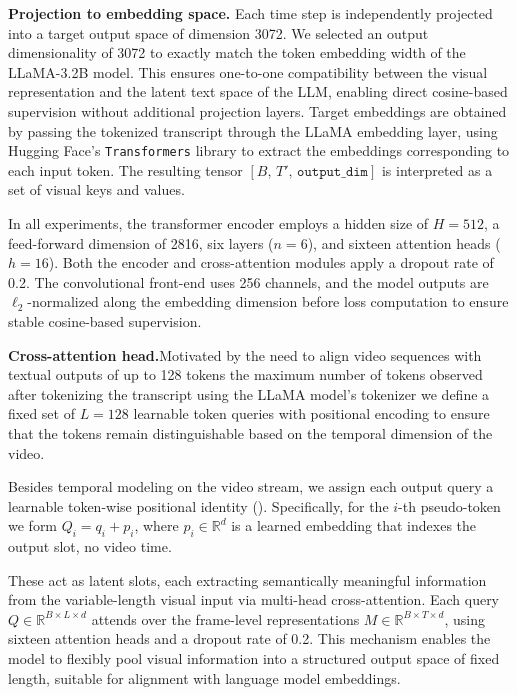 \documentclass[runningheads]{llncs}
\begin{document}
\textbf{Projection to embedding space.} 
Each time step is independently projected into a target output space of dimension 3072. 
We selected an output dimensionality of 3072 to exactly match the token embedding width of the LLaMA-3.2B model. 
This ensures one-to-one compatibility between the visual representation and the latent text space of the LLM, enabling direct cosine-based supervision without additional projection layers. 
Target embeddings are obtained by passing the tokenized transcript through the LLaMA embedding layer, using Hugging Face's \texttt{Transformers} library to extract the embeddings corresponding to each input token. 
The resulting tensor \([B,\, T',\, \mathtt{output\_dim}]\) is interpreted as a set of visual keys and values. 

In all experiments, the transformer encoder employs a hidden size of \(H=512\), a feed-forward dimension of 2816, six layers (\(n=6\)), and sixteen attention heads (\(h=16\)). 
Both the encoder and cross-attention modules apply a dropout rate of 0.2. 
The convolutional front-end uses 256 channels, and the model outputs are $\ell_2$-normalized along the embedding dimension before loss computation to ensure stable cosine-based supervision.

\textbf{Cross-attention head.}Motivated by the need to align video sequences with textual outputs of up to 128 tokens the maximum number of tokens observed after tokenizing the transcript using the LLaMA model's tokenizer we define a fixed set of \(L = 128\) learnable token queries with positional encoding to ensure that the tokens remain distinguishable based on the temporal dimension of the video. 

Besides temporal modeling on the video stream, we assign each output query a learnable token-wise positional identity (). Specifically, for the $i$-th pseudo-token we form $Q_i = q_i + p_i$, where $p_i \in \mathbb{R}^d$ is a learned embedding that indexes the output slot, no video time. 

These act as latent slots, each extracting semantically meaningful information from the variable-length visual input via multi-head cross-attention. Each query \(Q \in \mathbb{R}^{B \times L \times d}\) attends over the frame-level representations \(M \in \mathbb{R}^{B \times T \times d}\), using sixteen attention heads and a dropout rate of 0.2. This mechanism enables the model to flexibly pool visual information into a structured output space of fixed length, suitable for alignment with language model embeddings.
\end{document}
